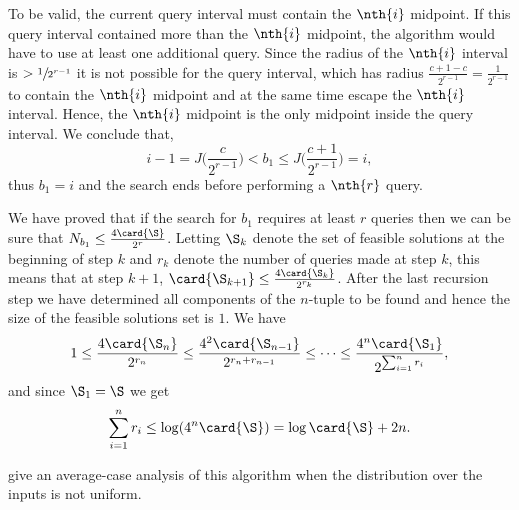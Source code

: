 To be valid, the current query interval must contain the \(\nth{i}\)
midpoint. If this query interval contained more than the \(\nth{i}\)
midpoint, the algorithm would have to use at least one additional query.
Since the radius of the \(\nth{i}\) interval is \(> \sfrac{1}{2^{r-1}}\) it is
not possible for the query interval, which has radius \( \frac{c+1-c}{2^{r-1}}
 = \frac{1}{2^{r-1}}\) to contain the \(\nth{i}\) midpoint and at
the same time escape the \(\nth{i}\) interval. Hence, the \(\nth{i}\) midpoint
is the only midpoint inside the query interval. We conclude that,
\begin{displaymath}
i-1 = J\bigg(\frac{c}{2^{r-1}}\bigg) < b_1 \le J\bigg(\frac{c+1}{2^{r-1}}\bigg) = i,
\end{displaymath}
thus $b_1 = i$ and the search ends before performing a $\nth{r}$ query.

We have proved that if the search for $b_1$ requires at least $r$ queries then
we can be sure that $N_{b_1} \le \frac{4\card{\S}}{2^r}$. Letting \(\S_{k}\)
denote the set of feasible solutions at the beginning of step \(k\) and
\(r_k\) denote the number of queries made at step \(k\), this means that at
step \(k+1\), \(\card{\S_{k+1}} \le \frac{4\card{\S_k}}{2^{r_k}}\).
After the last recursion step we have determined all components of
the \(n\)-tuple to be found and hence the size of the feasible solutions set
is \(1\). We have
\begin{displaymath}
1 \le \frac{4\card{\S_n}}{2^{r_n}} \le \frac{4^2\card{\S_{n-1}}}{2^{r_n +
r_{n-1}}} \le \cdots \le \frac{4^n\card{\S_1}}{2^{\sum_{i=1}^{n} r_i}},
\end{displaymath}
and since \(\S_1 = \S\) we get
\begin{displaymath}
\sum_{i=1}^{n} r_i \le \log (4^n \card{\S}) = \log \card{\S} + 2n.
\end{displaymath}

\citet*{moran:2015} give an average-case analysis of this algorithm when the
distribution over the inputs is not uniform.

